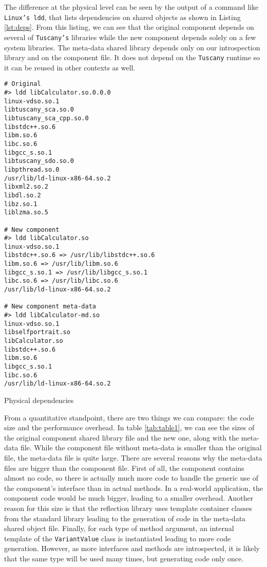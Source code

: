 The difference at the physical level can be seen by the output of a command like \texttt{Linux's ldd}, that lists
dependencies on shared objects as shown in Listing \ref{lst:deps}. From this listing, we can see that the original
component depends on several of \texttt{Tuscany's} libraries while the new component depends solely on a few system
libraries. The meta-data shared library depends only on our introspection library and on the component file. It does
not depend on the \texttt{Tuscany} runtime so it can be reused in other contexts as well.


\begin{listing}
\begin{verbatim}
# Original
#> ldd libCalculator.so.0.0.0 
linux-vdso.so.1
libtuscany_sca.so.0
libtuscany_sca_cpp.so.0
libstdc++.so.6
libm.so.6
libc.so.6
libgcc_s.so.1
libtuscany_sdo.so.0
libpthread.so.0
/usr/lib/ld-linux-x86-64.so.2
libxml2.so.2
libdl.so.2
libz.so.1
liblzma.so.5

# New component
#> ldd libCalculator.so 
linux-vdso.so.1
libstdc++.so.6 => /usr/lib/libstdc++.so.6
libm.so.6 => /usr/lib/libm.so.6
libgcc_s.so.1 => /usr/lib/libgcc_s.so.1
libc.so.6 => /usr/lib/libc.so.6
/usr/lib/ld-linux-x86-64.so.2

# New component meta-data
#> ldd libCalculator-md.so 
linux-vdso.so.1
libselfportrait.so
libCalculator.so
libstdc++.so.6
libm.so.6
libgcc_s.so.1
libc.so.6
/usr/lib/ld-linux-x86-64.so.2
 \end{verbatim}
\caption{Physical dependencies}
\label{lst:deps}
\end{listing}

From a quantitative standpoint, there are two things we can compare: the code size and the performance overhead.
In table \ref{tab:table1}, we can see the sizes of the original component shared library file and the new one,
along with the meta-data file. While the component file without meta-data is smaller than the original file,
the meta-data file is quite large. There are several reasons why the meta-data files are bigger than the component
file. First of all, the component contains almost no code, so there is actually much more code to handle the
generic use of the component's interface than in actual methods. In a real-world application, the component code
would be much bigger, leading to a smaller overhead. Another reason for this size is that the reflection library
uses template container classes from the standard library leading to the generation of code in the meta-data shared
object file. Finally, for each type of method argument, an internal template of the \texttt{VariantValue} class
is instantiated leading to more code generation. However, as more interfaces and methods are introspected, it is
likely that the same type will be used many times, but generating code only once.

